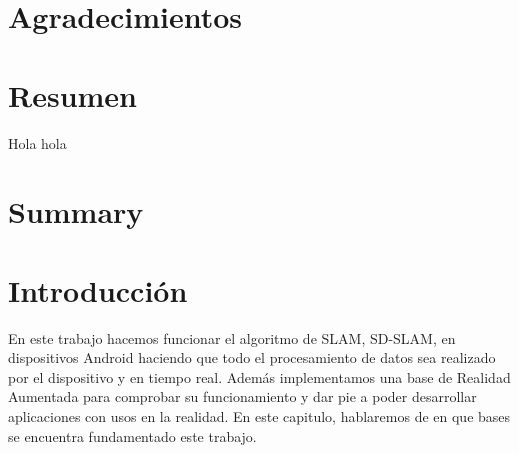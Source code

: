 \documentclass[a4paper, 12pt]{book}
\begin{document}
\chapter*{Agradecimientos}



\chapter*{Resumen}
Hola hola


\chapter*{Summary}




\tableofcontents 
\cleardoublepage
\listoffigures %



\cleardoublepage
\chapter{Introducción}
\label{sec:intro} %
En este trabajo hacemos funcionar el algoritmo de SLAM, SD-SLAM, en dispositivos Android haciendo que todo el procesamiento de datos sea realizado por el dispositivo y en tiempo real. Además implementamos una base de Realidad Aumentada para comprobar su funcionamiento y dar pie a poder desarrollar aplicaciones con usos en la realidad. En este capitulo, hablaremos de en que bases se encuentra fundamentado este trabajo.
\end{document}
